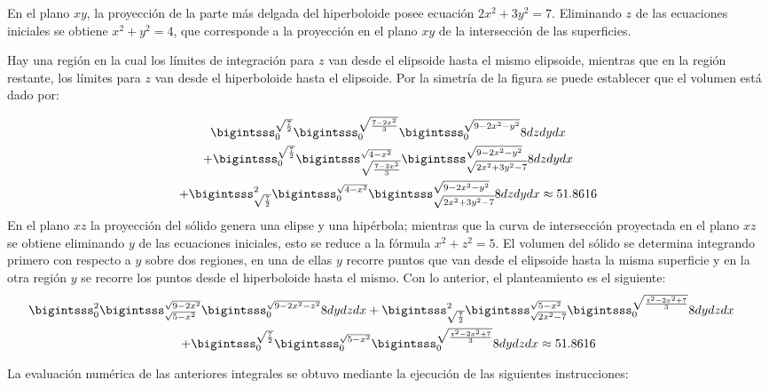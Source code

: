 \begin{parrafonumerado}
En el plano $xy$, la proyección de la parte más delgada del hiperboloide posee ecuación $2x^{2}+3y^{2}=7$. Eliminando $z$ de las ecuaciones iniciales se obtiene $x^{2}+y^{2}=4$, que corresponde a la proyección en el plano $xy$ de la intersección de las superficies.

Hay una región en la cual los límites de integración para $z$ van desde el elipsoide hasta el mismo elipsoide, mientras que en la región restante, los límites para $z$ van desde el hiperboloide hasta el elipsoide. Por la simetría de la figura se puede establecer que el volumen está dado por:

{\small
\begin{multline}
\bigintsss_{0}^{\sqrt{\frac{7}{2}}}\bigintsss_{0}^{\sqrt{\frac{7-2x^{2}}{3}}}\bigintsss_{0}^{\sqrt{9-2x^{2}-y^{2}}}8dzdydx \\
+ \bigintsss_{0}^{\sqrt{\frac{7}{2}}}\bigintsss_{\sqrt{\frac{7-2x^{2}}{3}}}^{\sqrt{4-x^{2}}}\bigintsss_{\sqrt{2x^{2}+3y^{2}-7}}^{\sqrt{9-2x^{2}-y^{2}}}8dzdydx\\
+\bigintsss_{\sqrt{\frac{7}{2}}}^2 \bigintsss_{0}^{\sqrt{4-x^{2}}}\bigintsss_{\sqrt{2x^{2}+3y^{2}-7}}^{\sqrt{9-2x^{2}-y^{2}}}8dzdydx \approx 51.8616 \label{ejercicio6}
\end{multline}
}
%
En el plano $xz$ la proyección del sólido genera una elipse y una hipérbola; mientras que la curva de intersección proyectada en el plano $xz$ se obtiene eliminando $y$ de las ecuaciones iniciales, esto se reduce a la fórmula $x^2+z^2=5$. El volumen del sólido se determina integrando primero con respecto a $y$ sobre dos regiones,
en una de ellas $y$ recorre puntos que van desde el elipsoide hasta la misma superficie y en la otra región $y$ se recorre los puntos desde el hiperboloide hasta el mismo. Con lo anterior, el planteamiento es el siguiente:
{\small
\begin{multline}
\hskip-0.4cm \bigintsss_{0}^2 \bigintsss_{\sqrt{5-x^{2}}}^{\sqrt{9-2x^{2}}}\bigintsss_{0}^{\sqrt{9-2x^{2}-z^{2}}}8dydzdx +
\bigintsss_{\sqrt{\frac{7}{2}}}^2 \bigintsss_{\sqrt{2x^{2}-7}}^{\sqrt{5-x^{2}}}\bigintsss_{0}^{\sqrt{\frac{z^{2}-2x^{2}+7}{3}}}8dydzdx  \\
+\bigintsss_{0}^{\sqrt{\frac{7}{2}}}\bigintsss_{0}^{\sqrt{5-x^{2}}}\bigintsss_{0}^{\sqrt{\frac{z^{2}-2x^{2}+7}{3}}}8dydzdx \approx 51.8616
\end{multline}
}
%

La evaluación numérica de las anteriores integrales se obtuvo mediante la
ejecución de las siguientes instrucciones:
%


\end{parrafonumerado}
